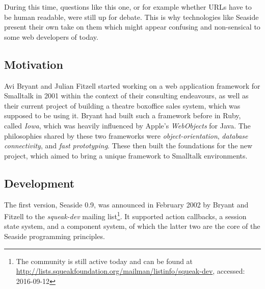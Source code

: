\documentclass[a4paper,12pt,pagesize,headsepline,oribibl,titlepage]{scrartcl}
\begin{document}
During this time, questions like this one, or for example whether URLs have to be human readable, were still up for debate. This is why technologies like Seaside present their own take on them which might appear confusing and non-sensical to some web developers of today. 


\subsection{Motivation}
\label{sec:motivation} 
\medskip

\bigskip

Avi Bryant and Julian Fitzell started working on a web application framework for Smalltalk in 2001 within the context of their consulting endeavours, as well as their current project of building a theatre boxoffice sales system, which was supposed to be using it. Bryant had built such a framework before in Ruby, called \emph{Iowa}, which was heavily influenced by Apple's \emph{WebObjects} for Java. The philosophies shared by these two frameworks were \emph{object-orientation}, \emph{database connectivity}, and \emph{fast prototyping}. These then built the foundations for the new project, which aimed to bring a unique framework to Smalltalk environments.


\subsection{Development}
\label{sec:dev} 

The first version, Seaside 0.9, was announced in February 2002 by Bryant and Fitzell to the \emph{squeak-dev} mailing list\footnote{The community is still active today and can be found at \url{http://lists.squeakfoundation.org/mailman/listinfo/squeak-dev}, accessed: 2016-09-12}. It supported action callbacks, a session state system, and a component system, of which the latter two are the core of the Seaside programming principles.
\end{document}
